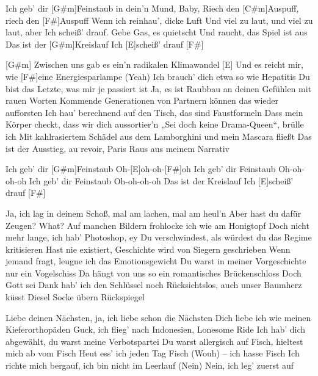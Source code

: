 

\begin{guitar}
	Ich geb' dir [G#m]Feinstaub in dein'n Mund, Baby, 
	Riech den [C#m]Auspuff, riech den [F#]Auspuff
	Wenn ich reinhau', dicke Luft 
	Und viel zu laut, und viel zu laut, aber 
	Ich scheiß' drauf. Gebe Gas, es quietscht
	Und raucht, das Spiel ist aus
	Das ist der [G#m]Kreislauf
	Ich [E]scheiß' drauf [F#]{}
	
	[G#m] Zwischen uns gab es ein'n radikalen Klimawandel
	[E] Und es reicht mir, wie [F#]eine Energiesparlampe (Yeah)
	Ich brauch' dich etwa so wie Hepatitis
	Du bist das Letzte, was mir je passiert ist
	Ja, es ist Raubbau an deinen Gefühlen mit rauen Worten
	Kommende Generationen von Partnern können das wieder aufforsten
	Ich hau' berechnend auf den Tisch, das sind Faustformeln
	Dass mein Körper checkt, dass wir dich aussortier'n
	„Sei doch keine Drama-Queen“, brülle ich 
	Mit kahlrasiertem Schädel aus dem Lamborghini und mein Mascara fließt
	Das ist der Ausstieg, au revoir, Paris
	Raus aus meinem Narrativ
	
	 

	Ich geb' dir [G#m]Feinstaub
	Oh-[E]oh-oh-[F#]oh
	Ich geb' dir Feinstaub
	Oh-oh-oh-oh
	Ich geb' dir Feinstaub
	Oh-oh-oh-oh
	Das ist der Kreislauf
	Ich [E]scheiß' drauf [F#]{}
	
	Ja, ich lag in deinem Schoß, mal am lachen, mal am heul'n
	Aber hast du dafür Zeugen?
	What? Auf manchen Bildern frohlocke ich wie am Honigtopf
	Doch nicht mehr lange, ich hab' Photoshop, ey
	Du verschwindest, als würdest du das Regime kritisieren
	Hast nie existiert, Geschichte wird von Siegern geschrieben
	Wenn jemand fragt, leugne ich das Emotionsgewicht
	Du warst in meiner Vorgeschichte nur ein Vogelschiss
	Da hängt von uns so ein romantisches Brückenschloss
	Doch Gott sei Dank hab' ich den Schlüssel noch
	Rücksichtslos, auch unser Baumherz küsst Diesel
	Socke übern Rückspiegel
	
	 
	
	 
	
	Liebe deinen Nächsten, ja, ich liebe schon die Nächsten
	Dich liebe ich wie meinen Kieferorthopäden
	Guck, ich flieg' nach Indonesien, Lonesome Ride
	Ich hab' dich abgewählt, du warst meine Verbotspartei
	Du warst allergisch auf Fisch, hieltest mich ab vom Fisch
	Heut ess' ich jeden Tag Fisch (Wouh) – ich hasse Fisch
	Ich richte mich bergauf, ich bin nicht im Leerlauf (Nein)
	Nein, ich leg' zuerst auf
	

\end{guitar}
